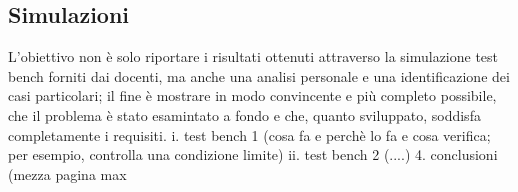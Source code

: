 \documentclass[paper=a4, fontsize=11pt]{scrartcl}
\numberwithin{equation}{section}		%
\numberwithin{figure}{section}			%
\numberwithin{table}{section}				%
\begin{document}
    \subsection{Simulazioni}
    \label{subsec:sim}
    L'obiettivo non è solo riportare i risultati ottenuti attraverso la
    simulazione test bench forniti dai docenti, ma anche una analisi personale e
    una identificazione dei casi particolari; il fine è mostrare in modo convincente
    e più completo possibile, che il problema è stato esamintato a fondo e che,
    quanto sviluppato, soddisfa completamente i requisiti.
    i. test bench 1 (cosa fa e perchè lo fa e cosa verifica; per esempio,
    controlla una condizione limite)
    ii. test bench 2 (....)
    4. conclusioni (mezza pagina max
%
%
\end{document}
